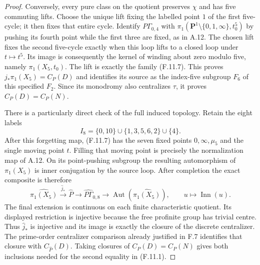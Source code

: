 \begin{proof}
Conversely, every pure class on the quotient
preserves $\chi$ and has five commuting lifts.
Choose the unique lift fixing the labelled
point $1$ of the first five-cycle; it then fixes
that entire cycle.  Identify
$P\Gamma_{0,4}$ with
$\pi_1(\mathbf P^1\setminus\{0,1,\infty\},t_0^5)$
by pushing its fourth point while the first
three are fixed, as in A.12.
The chosen lift fixes the second five-cycle
exactly when this loop lifts to a closed loop
under $t\mapsto t^5$.
Its image is consequently the kernel of winding
about zero modulo five, namely
$\pi_1(X_5,t_0)$.
The lift is exactly the family (F.11.7).
This proves
$j_*\pi_1(X_5)=C_P(D)$ and identifies its source
as the index-five subgroup $F_6$ of this specified
$F_2$.
Since its monodromy also centralizes $\tau$,
it proves $C_P(D)=C_P(N)$.

There is a particularly direct check of the full
induced topology.  Retain the eight labels
\[
              I_8=\{0,10\}\cup\{1,3,5,6,2\}\cup\{4\}.
                                                               \tag{F.11.9}
\]
After this forgetting map, (F.11.7) has the seven
fixed points $0,\infty,\mu_5$ and the single
moving point $t$.  Filling that moving point
is precisely the normalization map of A.12.
On its point-pushing subgroup the resulting
automorphism of $\pi_1(X_5)$ is inner conjugation
by the source loop.  After completion the exact
composite is therefore
\[
 \widehat{\pi_1(X_5)}
 \xrightarrow{\widehat j_*}\widehat P
 \longrightarrow\widehat{P\Gamma}_{0,8}
 \longrightarrow\operatorname{Aut}(\widehat{\pi_1(X_5)}),
               \qquad u\longmapsto\operatorname{Inn}(u).
                                                               \tag{F.11.10}
\]
The final extension is continuous on each finite
characteristic quotient.  Its displayed restriction
is injective because the free profinite group has
trivial centre.  Thus $\widehat j_*$ is injective
and its image is exactly the closure of the
discrete centralizer.  The prime-order centralizer
comparison already justified in F.7 identifies
that closure with $C_{\widehat P}(D)$.
Taking closures of $C_P(D)=C_P(N)$ gives both
inclusions needed for the second equality in
(F.11.1).


\end{proof}
